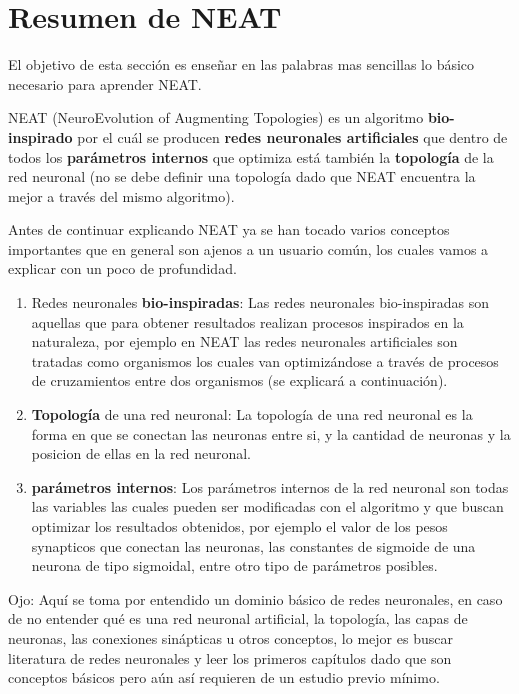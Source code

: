 \newpage
\section{Resumen de NEAT}

El objetivo de esta sección es enseñar en las palabras mas sencillas lo básico necesario para aprender NEAT. \newline

NEAT (NeuroEvolution of Augmenting Topologies) es un algoritmo \textbf{bio-inspirado} por el cuál se producen \textbf{redes neuronales artificiales} que dentro de todos los \textbf{parámetros internos} que optimiza está también la \textbf{topología} de la red neuronal (no se debe definir una topología dado que NEAT encuentra la mejor a través del mismo algoritmo). 

Antes de continuar explicando NEAT ya se han tocado varios conceptos importantes que en general son ajenos a un usuario común, los cuales vamos a explicar con un poco de profundidad.

\begin{enumerate}
\item Redes neuronales \textbf{bio-inspiradas}: Las redes neuronales bio-inspiradas son aquellas que para obtener resultados realizan procesos inspirados en la naturaleza, por ejemplo en NEAT las redes neuronales artificiales son tratadas como organismos los cuales van optimizándose a través de procesos de cruzamientos entre dos organismos (se explicará a continuación).
\item \textbf{Topología} de una red neuronal: La topología de una red neuronal es la forma en que se conectan las neuronas entre si, y la cantidad de neuronas y la posicion de ellas en la red neuronal.
\item \textbf{parámetros internos}: Los parámetros internos de la red neuronal son todas las variables las cuales pueden ser modificadas con el algoritmo y que buscan optimizar los resultados obtenidos, por ejemplo el valor de los pesos synapticos que conectan las neuronas, las constantes de sigmoide de una neurona de tipo sigmoidal, entre otro tipo de parámetros posibles. 
\end{enumerate}

Ojo: Aquí se toma por entendido un dominio básico de redes neuronales, en caso de no entender qué es una red neuronal artificial, la topología, las capas de neuronas, las conexiones sinápticas u otros conceptos, lo mejor es buscar literatura de redes neuronales y leer los primeros capítulos dado que son conceptos básicos pero aún así requieren de un estudio previo mínimo.

